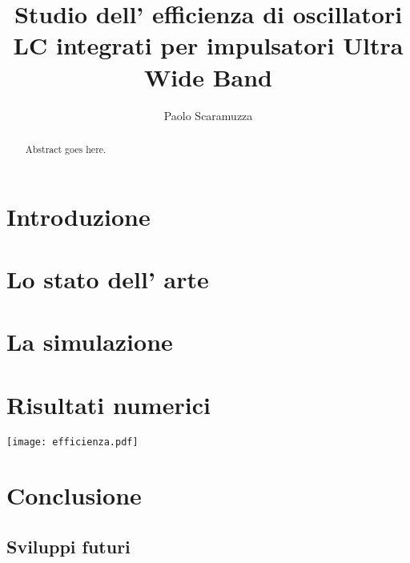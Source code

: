 \documentclass[a4paper]{memoir}
\author{Paolo Scaramuzza}
\title{Studio dell' efficienza di oscillatori LC integrati per impulsatori 
	Ultra Wide Band}
\date{} %
\begin{document}
\cleardoublepage{}
\newpage

\begin{vplace}[0.7]
\begin{abstract}
Abstract goes here.
\end{abstract}
\end{vplace}

\cleardoublepage{}
\newpage
\tableofcontents

\cleardoublepage{}
\chapter{Introduzione}

\cleardoublepage{}
\chapter{Lo stato dell' arte}

\cleardoublepage{}
\chapter{La simulazione}
\cite{Razavi11}
\cleardoublepage{}
\chapter{Risultati numerici}
\texttt{[image: efficienza.pdf]}
\cleardoublepage{}
\chapter{Conclusione}

\section{Sviluppi futuri}



\end{document}
